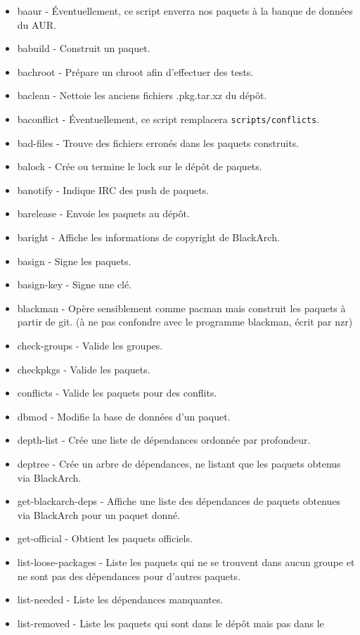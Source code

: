 \documentclass[a4paper, oneside, 11pt]{book}
\begin{document}
\begin{itemize}
\item baaur - Éventuellement, ce script enverra nos paquets à la banque de données
du AUR.
\item babuild - Construit un paquet.
\item bachroot - Prépare un chroot afin d'effectuer des tests.
\item baclean - Nettoie les anciens fichiers .pkg.tar.xz du dépôt.
\item baconflict - Éventuellement, ce script remplacera \verb|scripts/conflicts|.
\item bad-files - Trouve des fichiers erronés dans les paquets construits.
\item balock - Crée ou termine le lock sur le dépôt de paquets.
\item banotify - Indique IRC des push de paquets.
\item barelease - Envoie les paquets au dépôt.
\item baright - Affiche les informations de copyright de BlackArch.
\item basign - Signe les paquets.
\item basign-key - Signe une clé.
\item blackman - Opère sensiblement comme pacman mais construit les paquets à
partir de git. (à ne pas confondre avec le programme blackman, écrit par nzr)
\item check-groups - Valide les groupes.
\item checkpkgs - Valide les paquets.
\item conflicts - Valide les paquets pour des conflits.
\item dbmod - Modifie la base de données d'un paquet.
\item depth-list - Crée une liste de dépendances ordonnée par profondeur.
\item deptree - Crée un arbre de dépendances, ne listant que les paquets obtenus
via BlackArch.
\item get-blackarch-deps - Affiche une liste des dépendances de paquets obtenues
via BlackArch pour un paquet donné.
\item get-official - Obtient les paquets officiels.
\item list-loose-packages - Liste les paquets qui ne se trouvent dans aucun
groupe et ne sont pas des dépendances pour d'autres paquets.
\item list-needed - Liste les dépendances manquantes.
\item list-removed - Liste les paquets qui sont dans le dépôt mais pas dans le

\end{itemize}
\end{document}
